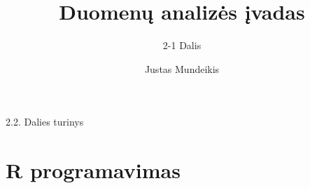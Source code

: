 \documentclass[11pt,xcolor=table]{beamer}
\author{Justas Mundeikis}
\title{Duomenų analizės įvadas}
\subtitle{2-1 Dalis}
\begin{document}

\begin{frame}
\titlepage
\end{frame}


\begin{frame}{2.2. Dalies turinys}
\tableofcontents
\end{frame}

\section{R programavimas}




\end{document}
